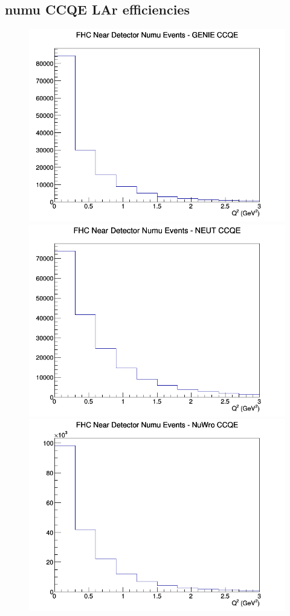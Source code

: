 \documentclass[12pt]{article}
\begin{document}
\subsection{numu CCQE LAr efficiencies}
\begin{figure}[h]
\includegraphics[width=\linewidth]{eff_Q2/LAr/CCQE_FHC_ND_numu_Q2_GENIE.png}
\endminipage
{}
\includegraphics[width=\linewidth]{eff_Q2/LAr/CCQE_FHC_ND_numu_Q2_NEUT.png}
\endminipage
{}
\includegraphics[width=\linewidth]{eff_Q2/LAr/CCQE_FHC_ND_numu_Q2_NuWro.png}

\end{figure}
\end{document}
